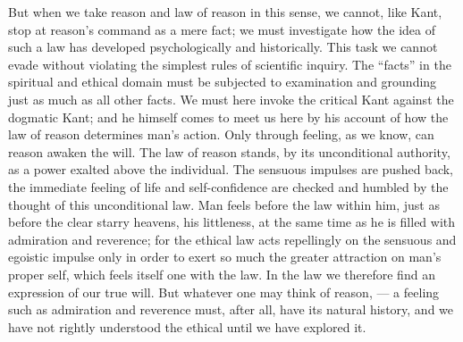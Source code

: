 \documentclass[12pt,a4paper,openany]{book}
\newcommand{\opage}[1]{\marginnote{\footnotesize\textit{[#1]}}}
\begin{document}
But when we take reason and law of reason in this sense, we cannot, like Kant,
stop \opage{51}at reason's command as a mere fact; we must investigate how the
idea of such a law has developed psychologically and historically. This task
we cannot evade without violating the simplest rules of scientific inquiry.
The ``facts'' in the spiritual and ethical domain must be subjected to
examination and grounding just as much as all other facts. We must here invoke
the critical Kant against the dogmatic Kant; and he himself comes to meet us
here by his account of how the law of reason determines man's action. Only
through feeling, as we know, can reason awaken the will. The law of reason
stands, by its unconditional authority, as a power exalted above the
individual. The sensuous impulses are pushed back, the immediate feeling of
life and self-confidence are checked and humbled by the thought of this
unconditional law. Man feels before the law within him, just as before the
clear starry heavens, his littleness, at the same time as he is filled with
admiration and reverence; for the ethical law acts repellingly on the sensuous
and egoistic impulse only in order to exert so much the greater attraction on
man's proper self, which feels itself one with the law. In the law we
therefore find an expression of our true will. But whatever one may think of
reason, --- a feeling such as admiration and reverence must, after all, have
its natural history, and we have not rightly understood the ethical until we
have explored it.
\end{document}
